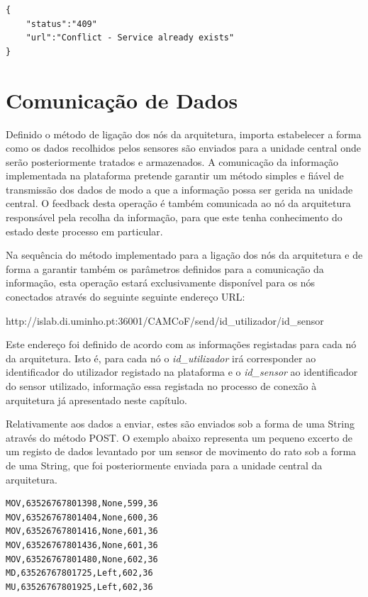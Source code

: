 \begin{lstlisting}[caption=Mensagem de conflito em JSON]
{
	"status":"409"
	"url":"Conflict - Service already exists"
}
\end{lstlisting}


\section{Comunicação de Dados}

Definido o método de ligação dos nós da arquitetura, importa estabelecer a forma como os dados recolhidos pelos sensores são enviados para a unidade central onde serão posteriormente tratados e armazenados. A comunicação da informação implementada na plataforma pretende garantir um método simples e fiável de transmissão dos dados de modo a que a informação possa ser gerida na unidade central. O feedback desta operação é também comunicada ao nó da arquitetura responsável pela recolha da informação, para que este tenha conhecimento do estado deste processo em particular.

Na sequência do método implementado para a ligação dos nós da arquitetura e de forma a garantir também os parâmetros definidos para a comunicação da informação, esta operação estará exclusivamente disponível para os nós conectados através do seguinte seguinte endereço URL:

http://islab.di.uminho.pt:36001/CAMCoF/send/id\_utilizador/id\_sensor

Este endereço foi definido de acordo com as informações registadas para cada nó da arquitetura. Isto é, para cada nó o \textit{id\_utilizador} irá corresponder ao identificador do utilizador registado na plataforma e o \textit{id\_sensor} ao identificador do sensor utilizado, informação essa registada no processo de conexão à arquitetura já apresentado neste capítulo.

Relativamente aos dados a enviar, estes são enviados sob a forma de uma String através do método POST. O exemplo abaixo representa um pequeno excerto de um registo de dados levantado por um sensor de movimento do rato sob a forma de uma String, que foi posteriormente enviada para a unidade central da arquitetura.\\
\begin{lstlisting}[caption=Excerto de dados fornecidos pelo movimento do rato]
MOV,63526767801398,None,599,36
MOV,63526767801404,None,600,36
MOV,63526767801416,None,601,36
MOV,63526767801436,None,601,36
MOV,63526767801480,None,602,36
MD,63526767801725,Left,602,36
MU,63526767801925,Left,602,36
\end{lstlisting}


